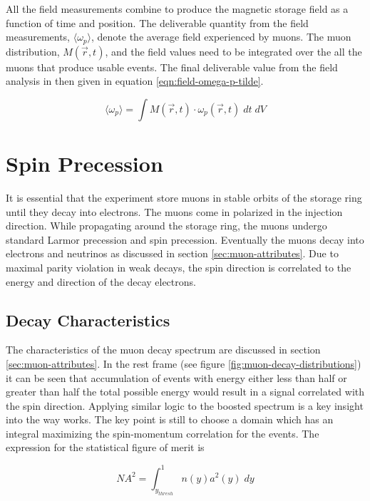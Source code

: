 All the field measurements combine to produce the magnetic storage field as a function of time and position.  The deliverable quantity from the field measurements, $\langle \omega_p \rangle$, denote the average field experienced by muons.  The muon distribution, $M(\vec{r}, t)$, and the field values need to be integrated over the all the muons that produce usable events.  The final deliverable value from the field analysis in then given in equation \ref{eqn:field-omega-p-tilde}.

\begin{equation}
\label{eqn:field-omega-p-tilde}
\langle \omega_p \rangle = \int M(\vec{r}, t) \cdot \omega_p(\vec{r}, t)\; dt\;dV
\end{equation}

\section{Spin Precession} \label{sec:spin-precession}

It is essential that the experiment store muons in stable orbits of the storage ring until they decay into electrons.  The muons come in polarized in the injection direction.  While propagating around the storage ring, the muons undergo standard Larmor precession and spin precession.  Eventually the muons decay into electrons and neutrinos as discussed in section \ref{sec:muon-attributes}. Due to maximal parity violation in weak decays, the spin direction is correlated to the energy and direction of the decay electrons.

\subsection{Decay Characteristics}

The characteristics of the muon decay spectrum are discussed in section \ref{sec:muon-attributes}. In the rest frame (see figure \ref{fig:muon-decay-distributions}) it can be seen that accumulation of events with energy either less than half or greater than half the total possible energy would result in a signal correlated with the spin direction.  Applying similar logic to the boosted spectrum is a key insight into the way \gmtwo works.  The key point is still to choose a domain which has an integral maximizing the spin-momentum correlation for the events.  The expression for the statistical figure of merit is 

\begin{equation}
\label{eqn:expt-figure-of-merit}
NA^2 = \int_{y_{thresh}}^{1} n(y) a^2(y) \;dy
\end{equation}

